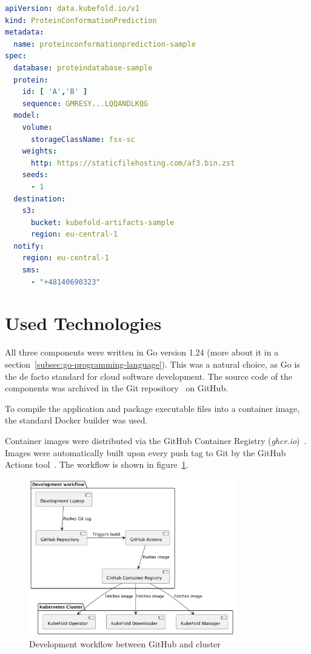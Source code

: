 \begin{lstlisting}[language=yaml,caption={Example \texttt{ProteinConformationPrediction} resource definition},label={lst:protein_conformation_prediction}]
apiVersion: data.kubefold.io/v1
kind: ProteinConformationPrediction
metadata:
  name: proteinconformationprediction-sample
spec:
  database: proteindatabase-sample
  protein:
    id: [ 'A','B' ]
    sequence: GMRESY...LQQANDLKQG
  model:
    volume:
      storageClassName: fsx-sc
    weights:
      http: https://staticfilehosting.com/af3.bin.zst
    seeds:
      - 1
  destination:
    s3:
      bucket: kubefold-artifacts-sample
      region: eu-central-1
  notify:
    region: eu-central-1
    sms:
      - "+48140690323"
\end{lstlisting}


\section{Used Technologies}
All three components were written in Go version 1.24 (more about it in a section~\ref{subsec:go-programming-language}).
This was a natural choice, as Go is the de facto standard for cloud software development.
The source code of the components was archived in the Git repository~\cite{git} on GitHub\cite{github}.

To compile the application and package executable files into a container image, the standard Docker builder was used.

Container images were distributed via the GitHub Container Registry (\textit{ghcr.io})~\cite{ghcr}.
Images were automatically built upon every push tag to Git by the GitHub Actions tool~\cite{github_actions}.
The workflow is shown in figure~\ref{fig:docker-images-flow}.

\begin{figure}[htbp]
    \centering
    \includegraphics[width=0.8\textwidth]{images/images}
    \caption{Development workflow between GitHub and cluster}
    \label{fig:docker-images-flow}
\end{figure}

